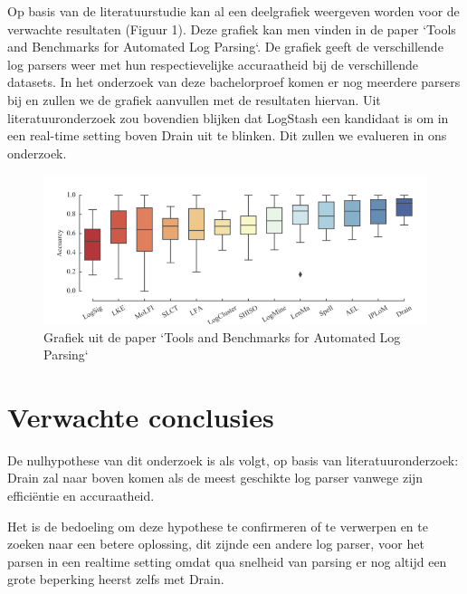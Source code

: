 Op basis van de literatuurstudie kan al een deelgrafiek weergeven worden voor de verwachte resultaten (Figuur 1). Deze grafiek kan men vinden in de paper `Tools and Benchmarks for Automated Log Parsing`. De grafiek geeft de verschillende log parsers weer met hun respectievelijke accuraatheid bij de verschillende datasets.
In het onderzoek van deze bachelorproef komen er nog meerdere parsers bij en zullen we de grafiek aanvullen met de resultaten hiervan. Uit literatuuronderzoek zou bovendien blijken dat LogStash een kandidaat is om in een real-time setting boven Drain uit te blinken. Dit zullen we evalueren in ons onderzoek.

\begin{figure}[H]
    \includegraphics[width= \linewidth]{graph.png}
    \caption{Grafiek uit de paper `Tools and Benchmarks for Automated Log Parsing`~\autocite{TBA2019}}
\end{figure}

\section{Verwachte conclusies}
\label{sec:verwachte_conclusies}

De nulhypothese van dit onderzoek is als volgt, op basis van literatuuronderzoek:\\
Drain zal naar boven komen als de meest geschikte log parser vanwege zijn efficiëntie en accuraatheid.

Het is de bedoeling om deze hypothese te confirmeren of te verwerpen en te zoeken naar een betere oplossing, dit zijnde een andere log parser, voor het parsen in een realtime setting omdat qua snelheid van parsing er nog altijd een grote beperking heerst zelfs met Drain.

